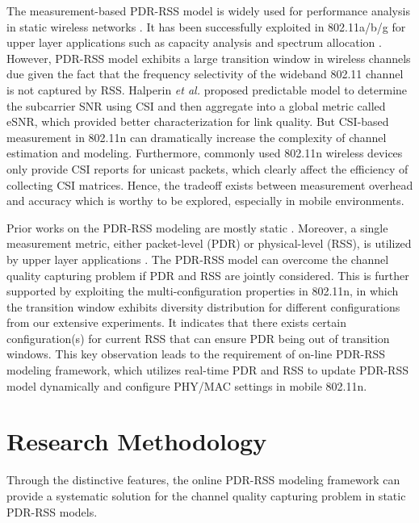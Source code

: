 \documentclass[draftclsnofoot,journal,onecolumn,11pt]{IEEEtran}
\begin{document}
The measurement-based PDR-RSS model is widely used for performance analysis in static wireless networks \cite{reis2006model}. It has been successfully exploited in 802.11a/b/g for upper layer applications such as capacity analysis \cite{kashyap2007capacity} and spectrum allocation \cite{k.rayanchu:fluid:}. However, PDR-RSS model exhibits a large transition window in wireless channels due given the fact that the frequency selectivity of the wideband 802.11 channel is not captured by RSS. Halperin \textit{et al.} \cite{Halperin2010predictable} proposed predictable model to determine the subcarrier SNR using CSI and then aggregate into a global metric called eSNR, which provided better characterization for link quality. But CSI-based measurement in 802.11n can dramatically increase the complexity of channel estimation and modeling. Furthermore, commonly used 802.11n wireless devices only provide CSI reports for unicast packets, which clearly affect the efficiency of collecting CSI matrices. Hence, the tradeoff exists between measurement overhead and accuracy which is worthy to be explored, especially in mobile environments.

Prior works on the PDR-RSS modeling are mostly static \cite{kashyap2007capacity} \cite{kolar2011mesh} \cite{reis2006model}. Moreover, a single measurement metric, either packet-level (PDR) or physical-level (RSS), is utilized by upper layer applications\cite{judd2008efficient} \cite{zhang2008practical}. The PDR-RSS model can overcome the channel quality capturing problem if PDR and RSS are jointly considered. This is further supported by exploiting the multi-configuration properties in 802.11n, in which the transition window exhibits diversity distribution for different configurations from our extensive experiments. It indicates that there exists certain configuration(s) for current RSS that can ensure PDR being out of transition windows. This key observation leads to the requirement of on-line PDR-RSS modeling framework, which utilizes real-time PDR and RSS to update PDR-RSS model dynamically and configure PHY/MAC settings in mobile 802.11n. 

\section{Research Methodology}

Through the distinctive features, the online PDR-RSS modeling framework can provide a systematic solution for the channel quality capturing problem in static PDR-RSS models.
\end{document}
